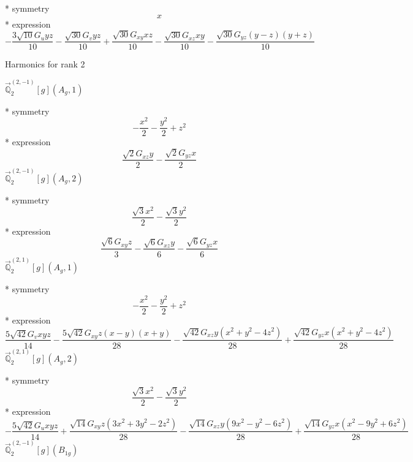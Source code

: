 \documentclass[fleqn,8pt]{jsarticle}
\begin{document}
\noindent\quad ** symmetry
\begin{dmath*}
x
\end{dmath*}
\noindent\quad ** expression
\begin{dmath*}
- \frac{3 \sqrt{10} G_{u} y z}{10} - \frac{\sqrt{30} G_{v} y z}{10} + \frac{\sqrt{30} G_{xy} x z}{10} - \frac{\sqrt{30} G_{xz} x y}{10} - \frac{\sqrt{30} G_{yz} \left(y - z\right) \left(y + z\right)}{10}
\end{dmath*}

\noindent * Harmonics for rank 2

\noindent\quad $\vec{\mathbb{Q}}_{2}^{(2,-1)}[g](A_{g},1)$

\noindent\quad ** symmetry
\begin{dmath*}
- \frac{x^{2}}{2} - \frac{y^{2}}{2} + z^{2}
\end{dmath*}
\noindent\quad ** expression
\begin{dmath*}
\frac{\sqrt{2} G_{xz} y}{2} - \frac{\sqrt{2} G_{yz} x}{2}
\end{dmath*}
\noindent\quad $\vec{\mathbb{Q}}_{2}^{(2,-1)}[g](A_{g},2)$

\noindent\quad ** symmetry
\begin{dmath*}
\frac{\sqrt{3} x^{2}}{2} - \frac{\sqrt{3} y^{2}}{2}
\end{dmath*}
\noindent\quad ** expression
\begin{dmath*}
\frac{\sqrt{6} G_{xy} z}{3} - \frac{\sqrt{6} G_{xz} y}{6} - \frac{\sqrt{6} G_{yz} x}{6}
\end{dmath*}
\noindent\quad $\vec{\mathbb{Q}}_{2}^{(2,1)}[g](A_{g},1)$

\noindent\quad ** symmetry
\begin{dmath*}
- \frac{x^{2}}{2} - \frac{y^{2}}{2} + z^{2}
\end{dmath*}
\noindent\quad ** expression
\begin{dmath*}
\frac{5 \sqrt{42} G_{v} x y z}{14} - \frac{5 \sqrt{42} G_{xy} z \left(x - y\right) \left(x + y\right)}{28} - \frac{\sqrt{42} G_{xz} y \left(x^{2} + y^{2} - 4 z^{2}\right)}{28} + \frac{\sqrt{42} G_{yz} x \left(x^{2} + y^{2} - 4 z^{2}\right)}{28}
\end{dmath*}
\noindent\quad $\vec{\mathbb{Q}}_{2}^{(2,1)}[g](A_{g},2)$

\noindent\quad ** symmetry
\begin{dmath*}
\frac{\sqrt{3} x^{2}}{2} - \frac{\sqrt{3} y^{2}}{2}
\end{dmath*}
\noindent\quad ** expression
\begin{dmath*}
- \frac{5 \sqrt{42} G_{u} x y z}{14} + \frac{\sqrt{14} G_{xy} z \left(3 x^{2} + 3 y^{2} - 2 z^{2}\right)}{28} - \frac{\sqrt{14} G_{xz} y \left(9 x^{2} - y^{2} - 6 z^{2}\right)}{28} + \frac{\sqrt{14} G_{yz} x \left(x^{2} - 9 y^{2} + 6 z^{2}\right)}{28}
\end{dmath*}
\noindent\quad $\vec{\mathbb{Q}}_{2}^{(2,-1)}[g](B_{1g})$
\end{document}
